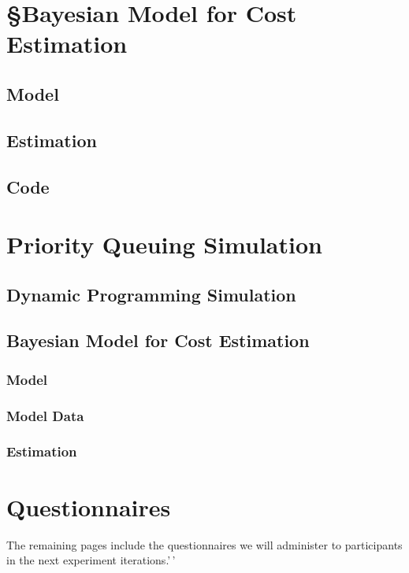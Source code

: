 \documentclass[
]{report}
\begin{document}
\hypertarget{bayesian-model-for-cost-estimation}{%
\section{§Bayesian Model for Cost
Estimation}\label{bayesian-model-for-cost-estimation}}

\hypertarget{model}{%
\subsection{Model}\label{model}}

\hypertarget{estimation}{%
\subsection{Estimation}\label{estimation}}

\hypertarget{code}{%
\subsection{Code}\label{code}}

\hypertarget{priority-queuing-simulation}{%
\section{Priority Queuing
Simulation}\label{priority-queuing-simulation}}

\hypertarget{dynamic-programming-simulation-1}{%
\subsection{Dynamic Programming
Simulation}\label{dynamic-programming-simulation-1}}

\hypertarget{bayesian-model-for-cost-estimation-1}{%
\subsection{Bayesian Model for Cost
Estimation}\label{bayesian-model-for-cost-estimation-1}}

\hypertarget{model-1}{%
\subsubsection{Model}\label{model-1}}

\hypertarget{model-data}{%
\subsubsection{Model Data}\label{model-data}}

\hypertarget{estimation-1}{%
\subsubsection{Estimation}\label{estimation-1}}

\hypertarget{questionnaires}{%
\section{Questionnaires}\label{questionnaires}}

The remaining pages include the questionnaires we will administer to
participants in the next experiment iterations.'\,'
\end{document}
